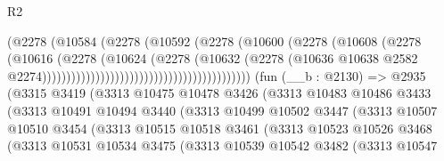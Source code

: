\begin{lexlean}{R2}
\begin{coremodule}
                                                          (@2278
                                                            (@10584
                                                              (@2278
                                                                (@10592
                                                                  (@2278
                                                                    (@10600
                                                                      (@2278
                                                                        (@10608
                                                                          (@2278
                                                                            (@10616
                                                                              (@2278
                                                                                (@10624
                                                                                  (@2278
                                                                                    (@10632
                                                                                      (@2278
                                                                                        (@10636
                                                                                          @10638
                                                                                          @2582
                                                                                          @2274)))))))))))))))))))))))))))))))))))))))))))
    (fun (__b : @2130) =>
    @2935
      (@3315
        @3419
        (@3313
          @10475
          @10478
          @3426
          (@3313
            @10483
            @10486
            @3433
            (@3313
              @10491
              @10494
              @3440
              (@3313
                @10499
                @10502
                @3447
                (@3313
                  @10507
                  @10510
                  @3454
                  (@3313
                    @10515
                    @10518
                    @3461
                    (@3313
                      @10523
                      @10526
                      @3468
                      (@3313
                        @10531
                        @10534
                        @3475
                        (@3313
                          @10539
                          @10542
                          @3482
                          (@3313
                            @10547

\end{coremodule}
\end{lexlean}
